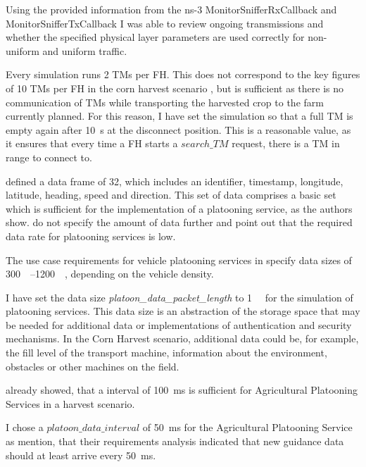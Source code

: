 Using the provided information from the ns-3 MonitorSnifferRxCallback and MonitorSnifferTxCallback I was able to review ongoing transmissions and
whether the specified physical layer parameters are used correctly for non-uniform and uniform traffic.

Every simulation runs \num{2} \ac{TM}s per \ac{FH}.
This does not correspond to the key figures of 10 \ac{TM}s per \ac{FH} in the corn harvest scenario \cite{faustzahlen2018},
but is sufficient as there is no communication of \ac{TM}s while transporting the harvested crop to the farm currently planned.
For this reason, I have set the simulation so that a full \ac{TM} is empty again after \SI{10}{\second} at the disconnect position.
This is a reasonable value, as it ensures that every time a \ac{FH} starts a $search\_TM$ request, there is a \ac{TM} in range to connect to.

\textcite{zhang_method_2009} defined a data frame of \SI{32}{\byte}, which includes an identifier, timestamp, longitude,
latitude, heading, speed and direction.
This set of data comprises a basic set which is sufficient for the implementation of a platooning service,
as the authors show.
\textcite{schlingmann_aef_2019} do not specify the amount of data further and point out that the required data rate
for platooning services is low.

The use case requirements for vehicle platooning services in \cite{TR-22.886} specify data sizes of \SIrange{300}{1200}{\kilo\byte},
depending on the vehicle density.

I have set the data size \textit{platoon\_data\_packet\_length} to \SI{1}{\kilo\byte} for the simulation of platooning services.
This data size is an abstraction of the storage space that may be needed for additional data or implementations
of authentication and security mechanisms.
In the Corn Harvest scenario, additional data could be, for example, the fill level of the transport machine,
information about the environment, obstacles or other machines on the field.

\textcite{zhang_method_2009} already showed, that a interval of \SI{100}{\milli\second} is sufficient for Agricultural Platooning Services
in a harvest scenario.

I chose a $platoon\_data\_interval$ of \SI{50}{\milli\second} for the Agricultural Platooning Service
as \textcite{smolnik_5g_2020} mention, that their requirements analysis indicated that new guidance data should at least arrive every \SI{50}{\milli\second}.

